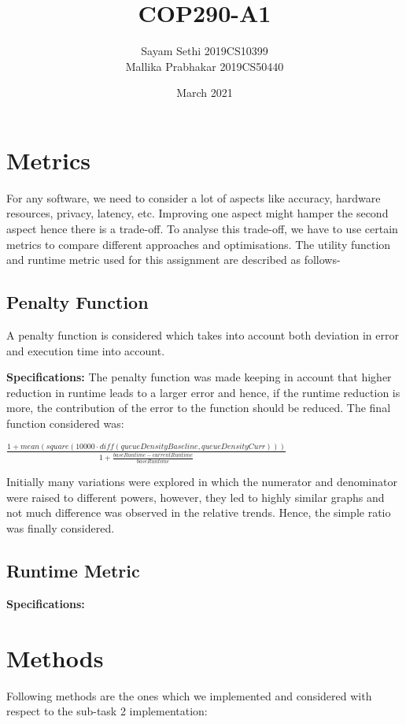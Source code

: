\documentclass{article}
\title{COP290-A1}
\author{Sayam Sethi 2019CS10399 \\ Mallika Prabhakar 2019CS50440 }
\date{March 2021}
\newcommand\ddfrac[2]{{\displaystyle\frac{\displaystyle #1}{\displaystyle #2}}}
\begin{document}
\maketitle

\section{Metrics}
For any software, we need to consider a lot of aspects like accuracy, hardware resources, privacy, latency, etc. Improving one aspect might hamper the second aspect hence there is a trade-off. To analyse this trade-off, we have to use certain metrics to compare different approaches and optimisations. The utility function and runtime metric used for this assignment are described as follows-

\subsection{Penalty Function}
A penalty function is considered which takes into account both deviation in error and execution time into account.

\textbf{Specifications:} The penalty function was made keeping in account that higher reduction in runtime leads to a larger error and hence, if the runtime reduction is more, the contribution of the error to the function should be reduced. The final function considered was:
\begin{center}
    $\ddfrac{1 + \mathit{mean}(\mathit{square}(10000\cdot\mathit{diff}(\mathit{queueDensityBaseline}, \mathit{queueDensityCurr})))}{1 + \frac{\mathit{baseRuntime} - \mathit{currentRuntime}}{\mathit{baseRuntime}}}$
\end{center}
Initially many variations were explored in which the numerator and denominator were raised to different powers, however, they led to highly similar graphs and not much difference was observed in the relative trends. Hence, the simple ratio was finally considered.

\subsection{Runtime Metric}
\textbf{Specifications:}


\section{Methods}
Following methods are the ones which we implemented and considered with respect to the sub-task 2 implementation:
\end{document}
